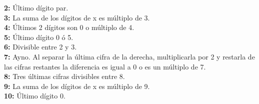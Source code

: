 \textbf{2:} Último dígito par.\\
\textbf{3:} La suma de los dígitos de x es múltiplo de 3.\\
\textbf{4:} Últimos 2 dígitos son 0 o múltiplo de 4.\\
\textbf{5:} Último dígito 0 ó 5.\\
\textbf{6:} Divisible entre 2 y 3.\\
\textbf{7:} Ayno. Al separar la última cifra de la derecha, multiplicarla por 2 y restarla de las cifras restantes la diferencia es igual a 0 o es un múltiplo de 7.\\
\textbf{8:} Tres últimas cifras divisibles entre 8.\\
\textbf{9:} La suma de los dígitos de x es múltiplo de 9.\\
\textbf{10:} Último dígito 0.\\